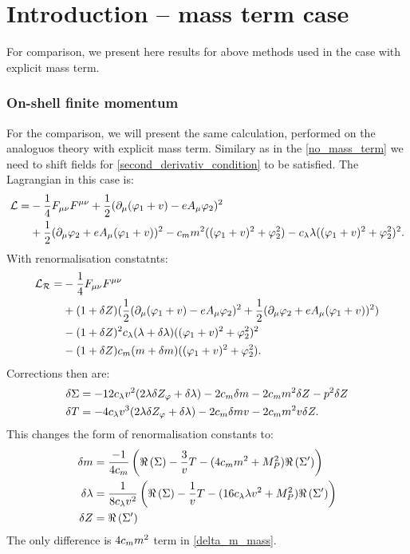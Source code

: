 \chapter{Introduction -- mass term case}
For comparison, we present here results for above methods used in the case with explicit mass term.

\subsection{On-shell finite momentum}
For the comparison, we will present the same calculation, performed on the analoguos theory with 
explicit mass term. Similary as in the \ref{no_mass_term} we need to shift fields for 
\ref{second_derivativ_condition} to be satisfied. The Lagrangian in this case is:
\begin{align}\label{mass_term_lagrangian}
\mathcal{L} = &-\frac{1}{4}F_{\mu\nu}F^{\mu\nu}+ 
\frac{1}{2}(\partial_\mu(\varphi_1+v) - eA_\mu\varphi_2)^2\\
&+\frac{1}{2}(\partial_\mu\varphi_2+eA_\mu(\varphi_1+v))^2 - c_m m^2((\varphi_1+v)^2+\varphi_2^2)
-c_\lambda\lambda((\varphi_1+v)^2+\varphi_2^2)^2. \notag
\end{align}
With renormalisation constatnts:
\begin{align}
\mathcal{L_R} = &-\frac{1}{4}F_{\mu\nu}F^{\mu\nu} \\
&+(1+ \delta Z)(\frac{1}{2}(\partial_\mu(\varphi_1+v) - eA_\mu\varphi_2)^2
+\frac{1}{2}(\partial_\mu\varphi_2+eA_\mu(\varphi_1+v))^2) \notag \\
&-(1+\delta Z)^2c_\lambda(\lambda+\delta\lambda)((\varphi_1+v)^2+\varphi_2^2)^2  \notag \\
&-(1+\delta Z)c_m(m+\delta m)((\varphi_1+v)^2+\varphi_2^2).
\end{align}
Corrections then are:
\begin{align}
\delta\Sigma&=-12c_\lambda v^2(2\lambda\delta Z_\varphi+\delta\lambda)-2c_m\delta m-2c_m m^2\delta Z -p^2\delta Z \\
\delta T&=-4c_\lambda v^3(2\lambda\delta Z_\varphi+\delta\lambda)-2c_m\delta m v-2c_m m^2v\delta Z.
\end{align}
This changes the form of renormalisation constants to:
\begin{align}
\delta m &= \frac{-1}{4c_m}\left(\Re\left(\Sigma\right)-\frac{3}{v}T-(4c_m m^2+M_P^2)\Re\left(\Sigma'\right)
\right)\label{delta_m_mass}\\
\delta\lambda &= \frac{1}{8c_\lambda v^2}\left(\Re\left(\Sigma\right)-\frac{1}{v}T-(16c_\lambda\lambda v^2+M_P^2)
\Re\left(\Sigma'\right)
\right)\\
\delta Z &= \Re\left(\Sigma'\right)
\end{align}
The only difference is $4c_m m^2$ term in \ref{delta_m_mass}. 

